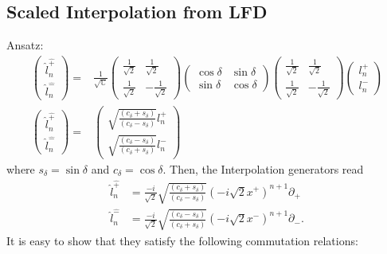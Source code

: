 \documentclass[]{article}
\numberwithin{equation}{section}
\begin{document}
{{\subsection{Scaled Interpolation from LFD}
Ansatz:
\begin{align}
    \begin{pmatrix}
        \hat{l}^{\hat{+}}_n\\
        \hat{l}^{\hat{-}}_n
    \end{pmatrix}=&\frac{1}{\sqrt{\mathbb{C}}}\begin{pmatrix}
        \frac{1}{\sqrt{2}}&\frac{1}{\sqrt{2}}\\
        \frac{1}{\sqrt{2}}&-\frac{1}{\sqrt{2}}
    \end{pmatrix}\begin{pmatrix}
        \cos{\delta}&\sin{\delta}\\
        \sin{\delta}&\cos{\delta}
    \end{pmatrix}\begin{pmatrix}
        \frac{1}{\sqrt{2}}&\frac{1}{\sqrt{2}}\\
        \frac{1}{\sqrt{2}}&-\frac{1}{\sqrt{2}}
    \end{pmatrix}\begin{pmatrix}
        l^{+}_n\\
        l^{-}_n
    \end{pmatrix}\\
    \begin{pmatrix}
        \hat{l}^{\hat{+}}_n\\
        \hat{l}^{\hat{-}}_n
    \end{pmatrix}=&\begin{pmatrix}
        \sqrt{\frac{(c_{\delta}+s_{\delta})}{(c_{\delta}-s_{\delta})}}l^{+}_n\\
        \sqrt{\frac{(c_{\delta}-s_{\delta})}{(c_{\delta}+s_{\delta})}}l^{-}_n
    \end{pmatrix}
\end{align}
where $s_{\delta}=\sin{\delta}$ and $c_{\delta}=\cos{\delta}$. Then, the Interpolation generators read
\begin{align}
    \hat{l}^{\hat{+}}_n&=\frac{-i}{\sqrt{2}}\sqrt{\frac{(c_{\delta}+s_{\delta})}{(c_{\delta}-s_{\delta})}}\left(-i\sqrt{2}x^{+}\right)^{n+1}\partial_{+}\\
    \hat{l}^{\hat{-}}_n&=\frac{-i}{\sqrt{2}}\sqrt{\frac{(c_{\delta}-s_{\delta})}{(c_{\delta}+s_{\delta})}}\left(-i\sqrt{2}x^{-}\right)^{n+1}\partial_{-}.
\end{align}
It is easy to show that they satisfy the following commutation relations:
}}
\end{document}
